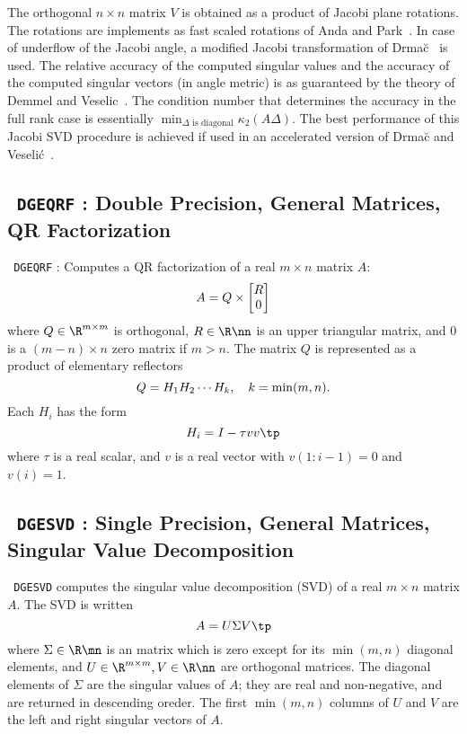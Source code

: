 \documentclass{article}
\newcommand{\code}[1]{\texttt{\color{green!30!black} #1}}
\begin{document}
The orthogonal $n \times n$ matrix $V$ is obtained as a product of
Jacobi plane rotations. The rotations are implements as fast scaled
rotations of Anda and Park~\cite{anpa94}. In case of underflow of
the Jacobi angle, a modified Jacobi transformation of
Drma\u{c}~\cite{drma97} is used. The relative accuracy of
the computed singular values and the accuracy of the computed singular
vectors (in angle metric) is as guaranteed by the theory of Demmel and
Veselic~\cite{deve92}. The condition number that determines the
accuracy in the full rank case is essentially $\min_{\Delta\text{ is
diagonal}}\kappa_2(A\Delta)$. The best performance of this Jacobi SVD
procedure is achieved if used in an accelerated version of Drma\u{c} and
Veseli\'{c}~\cite{drve08i,drve08ii}.

\subsection[\code{DGEQRF}]{\code{DGEQRF} : Double Precision, General
Matrices, QR Factorization}
\label{sec.DGEQRF}
\code{DGEQRF} : Computes a QR factorization of a real $m\times n$ matrix
$A$: 
\begin{equation}\notag
    A = Q \times 
    \begin{bmatrix}
        R \\ 0
    \end{bmatrix}
\end{equation} 
where $Q \in \R^{m\times m}$ is orthogonal, $R \in \R\nn$ is an upper
triangular matrix, and $0$ is a $(m-n)\times n$ zero matrix if $m > n$.
The matrix $Q$ is represented as a product of elementary reflectors 
\begin{equation}\notag
    Q = H_1 H_2 \cdots H_k, \quad k = \min(m,n).
\end{equation}
Each $H_i$ has the form 
\begin{equation}\notag
    H_i = I - \tau vv\tp 
\end{equation}
where $\tau$ is a real scalar, and $v$ is a real vector with $v(1:i-1) =
0$ and $v(i) = 1$.


\subsection[\code{DGESVD}]{\code{DGESVD} : Single Precision, General
Matrices, Singular Value Decomposition}
\label{sec.SGESVD}
\code{DGESVD} computes the singular value decomposition (SVD) of a real
$m\times n$ matrix $A$. The SVD is written 
\begin{equation}\notag
    A = U \Sigma V\tp
\end{equation}
where $\Sigma \in \R\mn$ is an matrix which is zero except for its
$\min(m,n)$ diagonal elements, and $U\in\R^{m\times m}, V \in \R\nn$ are
orthogonal matrices. The diagonal elements of $\Sigma$ are the singular
values of $A$; they are real and non-negative, and are returned in
descending oreder. The first $\min(m,n)$ columns of $U$ and $V$ are the
left and right singular vectors of $A$.
\end{document}
